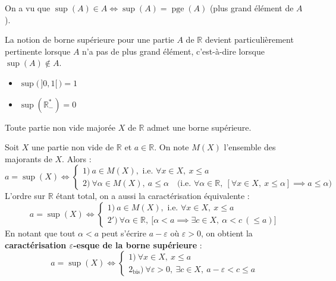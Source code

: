 \documentclass[a4paper,11pt]{article}
\newcommand{\R}{\mathbb{R}}
\DeclareMathOperator{\pge}{pge}
\newcommand{\mot}[1]{\textcolor{bordeaux}{\textbf{#1}}}
\begin{document}
On a vu que $\sup(A) \in A \iff \sup(A) = \pge(A)$ (plus grand élément de $A$).

La notion de borne supérieure pour une partie $A$ de $\R$ devient particulièrement pertinente lorsque $A$ n'a pas de plus grand élément, c'est-à-dire lorsque $\sup(A) \notin A$.

\begin{exemples}
\begin{itemize}
    \item $\sup\big(\,]0, 1[\,\big) = 1$
    \item $\sup(\R_-^*) = 0$
\end{itemize}
\end{exemples}

\begin{proposition}
Toute partie non vide majorée $X$ de $\R$ admet une borne supérieure.
\end{proposition}

\begin{proposition}
Soit $X$ une partie non vide de $\R$ et $a \in \R$. On note $M(X)$ l'ensemble des majorants de $X$. Alors :
\[
a = \sup(X) \iff
\begin{cases}
1)\ a \in M(X), \text{ i.e. } \forall x \in X, \ x \le a \\[4pt]
2)\ \forall \alpha \in M(X), \ a \le \alpha \quad \big(\text{i.e. } \forall \alpha \in \R, \ [\forall x \in X, \ x \le \alpha] \implies a \le \alpha\big)
\end{cases}
\]
L'ordre sur $\R$ étant total, on a aussi la caractérisation équivalente :
\[
a = \sup(X) \iff
\begin{cases}
1)\ a \in M(X), \text{ i.e. } \forall x \in X, \ x \le a \\[4pt]
2')\ \forall \alpha \in \R, \ \big[\alpha < a \implies \exists c \in X, \ \alpha < c \ (\le a)\big]
\end{cases}
\]
En notant que tout $\alpha < a$ peut s'écrire $a - \varepsilon$ où $\varepsilon > 0$, on obtient la \mot{caractérisation $\varepsilon$-esque de la borne supérieure} :
\[
a = \sup(X) \iff
\begin{cases}
1)\ \forall x \in X, \ x \le a \\[4pt]
2_{\text{bis}})\ \forall \varepsilon > 0, \ \exists c \in X, \ a - \varepsilon < c \le a
\end{cases}
\]
\end{proposition}
\end{document}
